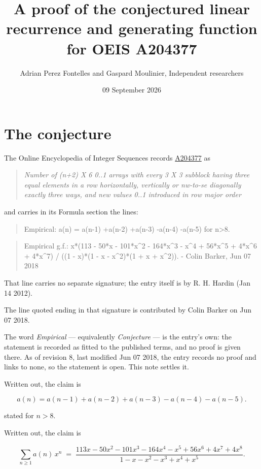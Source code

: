 \documentclass[11pt]{article}
\title{A proof of the conjectured linear recurrence and generating function for OEIS A204377}
\author{Adrian Perez Fontelles and Gaspard Moulinier, Independent researchers}
\date{09 September 2026}
\theoremstyle{definition}
\begin{document}
\maketitle
\section{The conjecture}

The Online Encyclopedia of Integer Sequences records \href{https://oeis.org/A204377}{A204377} as

\begin{quote}\itshape Number of (n+2) X 6 0..1 arrays with every 3 X 3 subblock having three equal elements in a row horizontally, vertically or nw-to-se diagonally exactly three ways, and new values 0..1 introduced in row major order\end{quote}

and carries in its Formula section the lines:

\begin{quote}\ttfamily Empirical: a(n) = a(n-1) +a(n-2) +a(n-3) -a(n-4) -a(n-5) for n>8.\end{quote}

\begin{quote}\ttfamily Empirical g.f.: x*(113 - 50*x - 101*x\textasciicircum{}2 - 164*x\textasciicircum{}3 - x\textasciicircum{}4 + 56*x\textasciicircum{}5 + 4*x\textasciicircum{}6 + 4*x\textasciicircum{}7) / ((1 - x)*(1 - x - x\textasciicircum{}2)*(1 + x + x\textasciicircum{}2)). - Colin Barker, Jun 07 2018\end{quote}

That line carries no separate signature; the entry itself is by R. H. Hardin (Jan 14 2012).

The line quoted ending in that signature is contributed by Colin Barker on Jun 07 2018.

The word {\itshape Empirical} --- equivalently {\itshape Conjecture} --- is the entry's own: the statement is recorded as fitted to the published terms, and no proof is given there. As of revision 8, last modified Jun 07 2018, the entry records no proof and links to none, so the statement is open. This note settles it.

Written out, the claim is

\[a(n) = a(n-1) + a(n-2) + a(n-3) - a(n-4) - a(n-5).\]

stated for $n > 8$.

Written out, the claim is

\[\sum_{n \ge 1} a(n)\,x^n \;=\; \frac{113x - 50x^{2} - 101x^{3} - 164x^{4} - x^{5} + 56x^{6} + 4x^{7} + 4x^{8}}{1 - x - x^{2} - x^{3} + x^{4} + x^{5}}.\]
\end{document}
